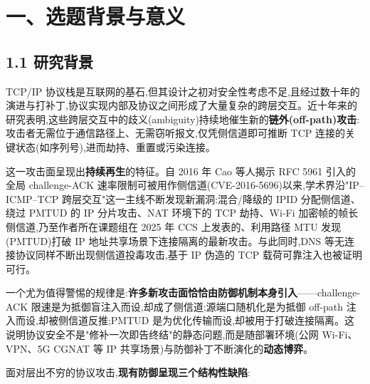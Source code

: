 \section*{一、选题背景与意义}
\subsection*{1.1 研究背景}
TCP/IP 协议栈是互联网的基石,但其设计之初对安全性考虑不足,且经过数十年的演进与打补丁,协议实现内部及协议之间形成了大量复杂的跨层交互。近十年来的研究表明,这些跨层交互中的歧义(ambiguity)持续地催生新的\textbf{链外(off-path)攻击}:攻击者无需位于通信路径上、无需窃听报文,仅凭侧信道即可推断 TCP 连接的关键状态(如序列号),进而劫持、重置或污染连接\supercite{feng2025cacm}。

这一攻击面呈现出\textbf{持续再生}的特征。自 2016 年 Cao 等人揭示 RFC 5961 引入的全局 challenge-ACK 速率限制可被用作侧信道(CVE-2016-5696)以来\supercite{cao2016offpath},学术界沿"IP–ICMP–TCP 跨层交互"这一主线不断发现新漏洞:混合/降级的 IPID 分配侧信道\supercite{feng2020mixedipid}、绕过 PMTUD 的 IP 分片攻击\supercite{feng2022pmtud}、NAT 环境下的 TCP 劫持\supercite{yang2024natwifi}、Wi-Fi 加密帧的帧长侧信道\supercite{wang2025packetsize},乃至作者所在课题组在 2025 年 CCS 上发表的、利用路径 MTU 发现(PMTUD)打破 IP 地址共享场景下连接隔离的最新攻击\supercite{feng2025pmtudisolation}。与此同时,DNS 等无连接协议同样不断出现侧信道投毒攻击\supercite{man2020saddns},基于 IP 伪造的 TCP 载荷可靠注入也被证明可行\supercite{pan2024tcpspoofing}。

一个尤为值得警惕的规律是:\textbf{许多新攻击面恰恰由防御机制本身引入}——challenge-ACK 限速是为抵御盲注入而设,却成了侧信道\supercite{cao2016offpath};源端口随机化\supercite{rfc6056}是为抵御 off-path 注入而设,却被侧信道反推\supercite{man2020saddns};PMTUD 是为优化传输而设,却被用于打破连接隔离\supercite{feng2025pmtudisolation}。这说明协议安全不是"修补一次即告终结"的静态问题,而是随部署环境(公网 Wi-Fi、VPN、5G CGNAT 等 IP 共享场景)与防御补丁不断演化的\textbf{动态博弈}。

面对层出不穷的协议攻击,\textbf{现有防御呈现三个结构性缺陷}:

